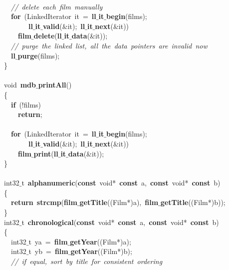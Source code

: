 \documentclass{article}
\begin{document}
\mbox{} \\
\mbox{}\ \ \textit{//\ delete\ each\ film\ manually} \\
\mbox{}\ \ \textbf{for}\ (LinkedIterator\ it\ =\ \textbf{ll$\_$it$\_$begin}(films); \\
\mbox{}\ \ \ \ \ \ \ \textbf{ll$\_$it$\_$valid}(\&it);\ \textbf{ll$\_$it$\_$next}(\&it)) \\
\mbox{}\ \ \ \ \textbf{film$\_$delete}(\textbf{ll$\_$it$\_$data}(\&it)); \\
\mbox{}\ \ \textit{//\ purge\ the\ linked\ list,\ all\ the\ data\ pointers\ are\ invalid\ now} \\
\mbox{}\ \ \textbf{ll$\_$purge}(films); \\
\mbox{}\} \\
\mbox{} \\
\mbox{}void\ \textbf{mdb$\_$printAll}() \\
\mbox{}\{ \\
\mbox{}\ \ \textbf{if}\ (!films) \\
\mbox{}\ \ \ \ \textbf{return}; \\
\mbox{} \\
\mbox{}\ \ \textbf{for}\ (LinkedIterator\ it\ =\ \textbf{ll$\_$it$\_$begin}(films); \\
\mbox{}\ \ \ \ \ \ \ \textbf{ll$\_$it$\_$valid}(\&it);\ \textbf{ll$\_$it$\_$next}(\&it)) \\
\mbox{}\ \ \ \ \textbf{film$\_$print}(\textbf{ll$\_$it$\_$data}(\&it)); \\
\mbox{}\} \\
\mbox{} \\
\mbox{}int32$\_$t\ \textbf{alphanumeric}(\textbf{const}\ void*\ \textbf{const}\ a,\ \textbf{const}\ void*\ \textbf{const}\ b) \\
\mbox{}\{ \\
\mbox{}\ \ \textbf{return}\ \textbf{strcmp}(\textbf{film$\_$getTitle}((Film*)a),\ \textbf{film$\_$getTitle}((Film*)b)); \\
\mbox{}\} \\
\mbox{}int32$\_$t\ \textbf{chronological}(\textbf{const}\ void*\ \textbf{const}\ a,\ \textbf{const}\ void*\ \textbf{const}\ b) \\
\mbox{}\{ \\
\mbox{}\ \ int32$\_$t\ ya\ =\ \textbf{film$\_$getYear}((Film*)a); \\
\mbox{}\ \ int32$\_$t\ yb\ =\ \textbf{film$\_$getYear}((Film*)b); \\
\mbox{}\ \ \textit{//\ if\ equal,\ sort\ by\ title\ for\ consistent\ ordering} \\
\end{document}
